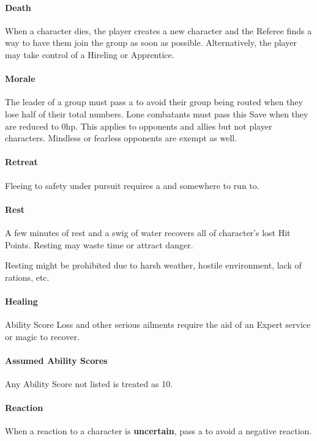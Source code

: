 \documentclass[itdr]{subfiles}
\begin{document}
\vfill
\paragraph{Death}
When a character dies, the player creates a new character and the Referee finds a way to have them join the group as soon as possible. Alternatively, the player may take control of a Hireling or Apprentice.

\vfill
\paragraph{Morale}
The leader of a group must pass a  to avoid their group being routed when they lose half of their total numbers. Lone combatants must pass this Save when they are reduced to 0hp. This applies to opponents and allies but not player characters. Mindless or fearless opponents are exempt as well.

\vfill
\paragraph{Retreat}
Fleeing to safety under pursuit requires a  and somewhere to run to.

\vfill
\paragraph{Rest}
A few minutes of rest and a swig of water recovers all of character's lost Hit Points. Resting may waste time or attract danger.

Resting might be prohibited due to harsh weather, hostile environment, lack of rations, etc.

\vfill
\paragraph{Healing}
Ability Score Loss and other serious ailments require the aid of an Expert service or magic to recover.

\vfill
\paragraph{Assumed Ability Scores}
Any Ability Score not listed is treated as 10.

\vfill
\paragraph{Reaction}
When a reaction to a character is \textbf{uncertain}, pass a  to avoid a negative reaction.
\end{document}
